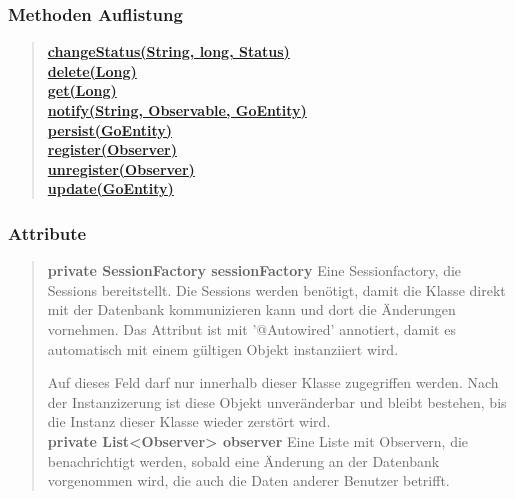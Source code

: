 \documentclass[11pt,a4paper]{article}
\begin{document}
{{{{{{{{{{{\subsubsection{Methoden Auflistung}{
\begin{verse}
\hyperlink{edu.kit.pse17.go_app.PersistenceLayer.daos.GoDaoImp.changeStatus(java.lang.String, long, edu.kit.pse17.go_app.PersistenceLayer.Status)}{{\bf changeStatus(String, long, Status)}} \\
\hyperlink{edu.kit.pse17.go_app.PersistenceLayer.daos.GoDaoImp.delete(java.lang.Long)}{{\bf delete(Long)}} \\
\hyperlink{edu.kit.pse17.go_app.PersistenceLayer.daos.GoDaoImp.get(java.lang.Long)}{{\bf get(Long)}} \\
\hyperlink{edu.kit.pse17.go_app.PersistenceLayer.daos.GoDaoImp.notify(java.lang.String, edu.kit.pse17.go_app.ServiceLayer.Observable, edu.kit.pse17.go_app.PersistenceLayer.GoEntity)}{{\bf notify(String, Observable, GoEntity)}} \\
\hyperlink{edu.kit.pse17.go_app.PersistenceLayer.daos.GoDaoImp.persist(edu.kit.pse17.go_app.PersistenceLayer.GoEntity)}{{\bf persist(GoEntity)}} \\
\hyperlink{edu.kit.pse17.go_app.PersistenceLayer.daos.GoDaoImp.register(edu.kit.pse17.go_app.ServiceLayer.Observer)}{{\bf register(Observer)}} \\
\hyperlink{edu.kit.pse17.go_app.PersistenceLayer.daos.GoDaoImp.unregister(edu.kit.pse17.go_app.ServiceLayer.Observer)}{{\bf unregister(Observer)}} \\
\hyperlink{edu.kit.pse17.go_app.PersistenceLayer.daos.GoDaoImp.update(edu.kit.pse17.go_app.PersistenceLayer.GoEntity)}{{\bf update(GoEntity)}} \\
\end{verse}
}
\subsubsection{Attribute}{
\begin{verse}
{{\bf private SessionFactory sessionFactory}} Eine Sessionfactory, die Sessions bereitstellt. Die Sessions werden benötigt, damit die Klasse direkt mit der Datenbank
      kommunizieren kann und dort die Änderungen vornehmen. Das Attribut ist mit '@Autowired' annotiert, damit es automatisch
     mit einem gültigen Objekt instanziiert wird.
     
      Auf dieses Feld darf nur innerhalb dieser Klasse zugegriffen werden. Nach der Instanzizerung ist diese Objekt unveränderbar und
      bleibt bestehen, bis die Instanz dieser Klasse wieder zerstört wird.\\[0.5em]
{{\bf private List<Observer> observer}} Eine Liste mit Observern, die benachrichtigt werden, sobald eine Änderung an der Datenbank vorgenommen wird, die auch die Daten anderer Benutzer betrifft.
\end{verse}
}
}}}}}}}}}}}
\end{document}
